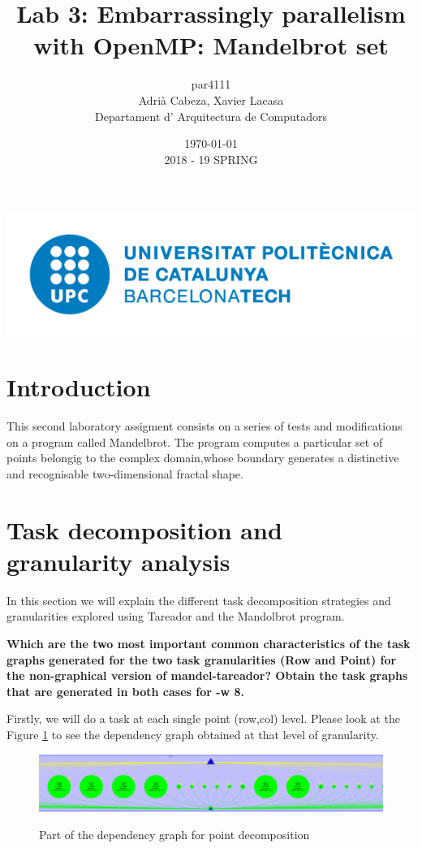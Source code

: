 \documentclass[12]{article}
\author{par4111 \\ Adrià Cabeza, Xavier Lacasa \\ Departament d' Arquitectura de Computadors}
\title{Lab 3: Embarrassingly parallelism with OpenMP: Mandelbrot set }
\date{\today \\ 2018 - 19 SPRING}
\begin{document}
\maketitle

\vspace*{\fill}
\begin{center}
\includegraphics[scale=0.5]{images/UPClogo.png}
\end{center}
\newpage
\tableofcontents
\newpage
\section{Introduction}

This second laboratory assigment consists on a series of tests and modifications on a program called Mandelbrot. The program computes a particular set of points belongig to the complex domain,whose boundary generates a distinctive and recognisable two-dimensional fractal shape.

\section{Task decomposition and granularity analysis}
In this section we will explain the different task decomposition strategies and granularities explored using Tareador and the Mandolbrot program. 


\textbf{Which are the two most important common characteristics of the task graphs generated for the two task granularities (Row and Point) for the non-graphical version of mandel-tareador? Obtain the task graphs that are generated in both cases for -w 8.
}

Firstly, we will do a task at each single point (row,col) level. Please look at the Figure \ref{point} to see the dependency graph obtained at that level of granularity. 

\begin{figure}[H]
\centering
\includegraphics[scale=0.25]{images/point_dependencygraph.png}
\label{point}
\caption{Part of the dependency graph for point decomposition}
\end{figure}
\end{document}
